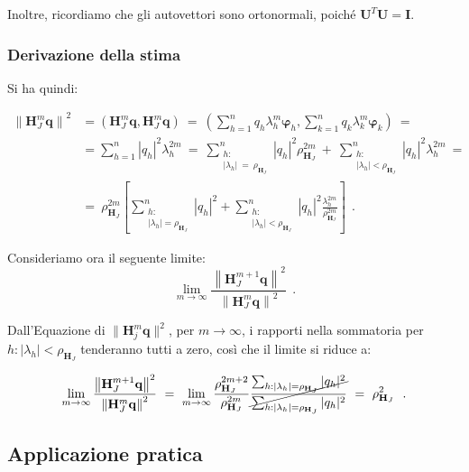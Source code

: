 Inoltre, ricordiamo che gli autovettori sono ortonormali, poiché \(\mathbf{U}^T \mathbf{U} = \mathbf{I}\).



\subsubsection{Derivazione della stima}

Si ha quindi:

\[
\begin{aligned}
	\left\| \mathbf{H}_J^m \mathbf{q} \right\|^2 &= \left( \mathbf{H}_J^m \mathbf{q}, \mathbf{H}_J^m \mathbf{q} \right)\
	=\ \left( \sum_{h=1}^{n} q_h \lambda_h^m \mathbf{\varphi}_h, \sum_{k=1}^{n} q_k \lambda_k^m \mathbf{\varphi}_k \right)\ = \\
	&= \sum_{h=1}^{n} |q_h|^2 \lambda_h^{2m}\
	=\ \sum_{\substack{h: \\ |\lambda_h|\ =\ \rho_{\mathbf{H}_J}}}^n |q_h|^2 \rho_{\mathbf{H}_J}^{2m} \ +\ \sum_{\substack{h: \\ |\lambda_h| < \rho_{\mathbf{H}_J}}}^n |q_h|^2 \lambda_h^{2m}\ = \\
	&=\ \rho_{\mathbf{H}_J}^{2m} \left[ \sum_{\substack{h: \\ |\lambda_h| = \rho_{\mathbf{H}_J}}}^n |q_h|^2 + \sum_{\substack{h: \\ |\lambda_h| < \rho_{\mathbf{H}_J}}}^n |q_h|^2 \frac{\lambda_h^{2m}}{\rho_{\mathbf{H}_J}^{2m}} \right]\ \ . 
\end{aligned}
\]

Consideriamo ora il seguente limite: \[\lim_{m \to \infty} \frac{\left\| \mathbf{H}_J^{m+1} \mathbf{q} \right\|^2}{\left\| \mathbf{H}_J^m \mathbf{q} \right\|^2}\ \ .\]  

Dall'Equazione di $\|\mathbf H^m_j \mathbf q\|^2$, per \(m \to \infty\), i rapporti nella sommatoria per \(h: |\lambda_h| < \rho_{\mathbf{H}_J}\) tenderanno tutti a zero, così che il limite si riduce a:

\[
\lim_{m \to \infty} \frac{\left\| \mathbf{H}_J^{m+1} \mathbf{q} \right\|^2}{\left\| \mathbf{H}_J^m \mathbf{q} \right\|^2}\ =\
\lim_{m \to \infty} \frac{\rho_{\mathbf{H}_J}^{2m+2}}{\rho_{\mathbf{H}_J}^{2m}} \cancel{\frac{\sum_{h: |\lambda_h| = \rho_{\mathbf{H}_J}} |q_h|^2}{\sum_{h: |\lambda_h| = \rho_{\mathbf{H}_J}} |q_h|^2}}\ =\ \rho_{\mathbf{H}_J}^2\ \ . 
\]



\subsection{Applicazione pratica}

